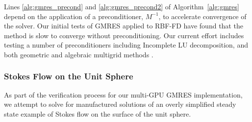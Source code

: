 Lines \ref{alg:gmres_precond} and \ref{alg:gmres_precond2} of Algorithm~\ref{alg:gmres} depend on the application of a preconditioner, $M^{-1}$, to accelerate convergence of the solver. Our initial tests of GMRES applied to RBF-FD have found that the method is slow to converge without preconditioning. Our current effort includes testing a number of preconditioners including Incomplete LU decomposition, and both geometric and algebraic multigrid methods \cite{Saad2003}.
%
%
%




\subsubsection{Stokes Flow on the Unit Sphere}

As part of the verification process for our multi-GPU GMRES implementation, we attempt to solve for manufactured solutions of an overly simplified steady state example of Stokes flow on the surface of the unit sphere. 



